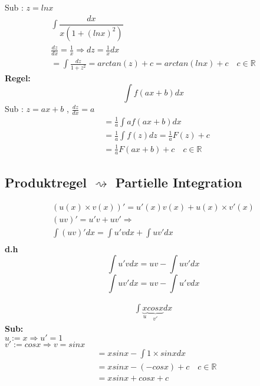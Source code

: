 \begin{example}
Sub : $z = lnx $
\begin{gather*}
\int \dfrac{dx}{ x (1+(lnx)^2)}\\
\frac{dz}{dx} = \frac{1}{x} \Rightarrow dz = \frac{1}{x} dx
\\
= \int \frac{dz}{ 1 + z^2} = arctan(z) + c = arctan(ln x )+ c \quad c \in \mathbb{R}
\end{gather*}
\textbf{Regel:}
$$ \int f(ax+b)dx $$
Sub : $z = ax+b $ , $ \frac{dz}{dx} = a $
\begin{align*}
&= \frac{1}{a} \int a f(ax+b) dx \\
&= \frac{1}{a} \int f(z)dz = \frac{1}{a} F(z) + c \\
&=\frac{1}{a} F(ax +b) + c \quad c \in \mathbb{R}
\end{align*}
\end{example}
\subsection{Produktregel $\rightsquigarrow$  \textbf{Partielle Integration}}
\begin{gather*}
(u(x) \times v(x))' = u'(x) v(x) + u(x) \times v'(x)\\
(uv)' = u'v + uv' \Rightarrow\\
\int(uv)'dx = \int u'v dx + \int uv' dx\\
\end{gather*}
\textbf{d.h}
\[ \int u'v dx = u v - \int u v' dx \]
\[ \int uv' dx = u v - \int u' v dx \]
\begin{example}
\begin{align*}
\int \underbrace{x}_{u} \underbrace{cosx}_{v'} dx 
\end{align*}
\textbf{Sub:}\\
$u  := x \Rightarrow u' = 1$\\
$v' := cos x \Rightarrow v = sinx $
\begin{align*}
&= x sinx - \int 1 \times sinx dx \\
&= x sinx - (-cos x) + c \quad c \in \mathbb{R}\\
&= x sinx + cos x + c
\end{align*}
\end{example}

